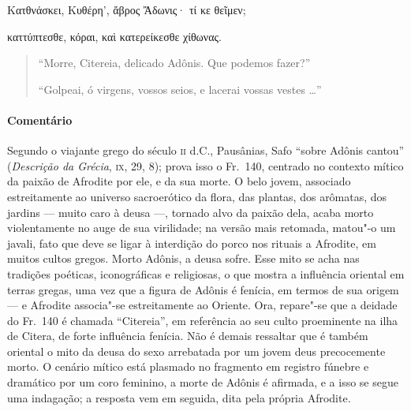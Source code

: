 \begin{gkverse}
Κατθνάσκει, Κυθέρη’, ἄβρος Ἄδωνις· τί κε θεῖμεν;

καττύπτεσθε, κόραι, καὶ κατερείκεσθε χίθωνας.
\end{gkverse}

\begin{verse}
“Morre, Citereia, delicado Adônis. Que podemos fazer?”

“Golpeai, ó virgens, vossos seios, e lacerai vossas vestes \ldots{}”
\end{verse}

{\paragraph{Comentário} Segundo o viajante grego do século \textsc{ii} d.C., Pausânias, Safo “sobre
Adônis cantou” (\textit{Descrição da Grécia}, \textsc{ix}, 29, 8); prova isso o Fr.~140, 
centrado no contexto mítico da paixão de Afrodite por ele, e da sua morte.
O belo jovem, associado estreitamente ao universo sacroerótico da
flora, das plantas, dos arômatas, dos jardins --- muito caro à deusa ---,
tornado alvo da paixão dela, acaba morto violentamente no auge de sua
virilidade; na versão mais retomada, matou"-o um javali, fato que deve se ligar
à interdição do porco nos rituais a Afrodite, em muitos cultos gregos. Morto
Adônis, a deusa sofre. Esse mito se acha nas tradições poéticas, iconográficas
e religiosas, o que mostra a influência oriental em terras gregas, uma vez que
a figura de Adônis é fenícia, em termos de sua origem --- e Afrodite associa"-se
estreitamente ao Oriente. Ora, repare"-se que a deidade do Fr.~140 é chamada
``Citereia”, em referência ao seu culto proeminente na ilha de Citera,
de forte influência fenícia.
Não é demais ressaltar que é também oriental o
mito da deusa do sexo arrebatada por um jovem deus precocemente morto. O
cenário mítico está plasmado no fragmento em registro fúnebre e dramático por um coro feminino, a morte de Adônis é afirmada, e a isso
se segue uma indagação; a resposta vem em seguida, dita pela própria Afrodite.

}
